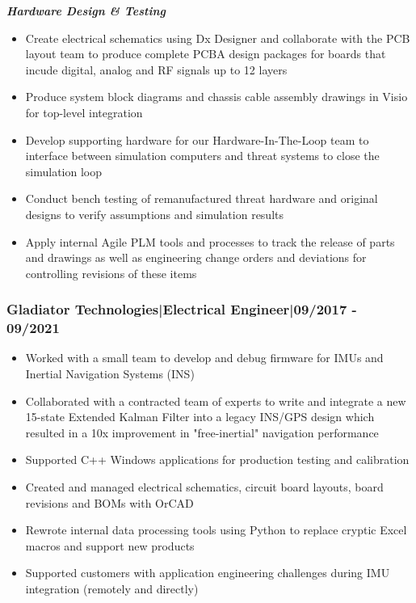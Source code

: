 \documentclass[]{article}
\begin{document}
\begin{singlespace}
\noindent\textbf{\emph{Hardware Design \& Testing}}    
\begin{itemize}
    \setlength\itemsep{0em}
    \item Create electrical schematics using Dx Designer and collaborate with the PCB layout team to produce 
    complete PCBA design packages for boards that incude digital, analog and RF signals up to 12 layers
    \item Produce system block diagrams and chassis cable assembly drawings in Visio for top-level integration
    \item Develop supporting hardware for our Hardware-In-The-Loop team to interface between simulation computers 
    and threat systems to close the simulation loop
    \item Conduct bench testing of remanufactured threat hardware and original designs to verify assumptions and simulation results
    \item Apply internal Agile PLM tools and processes to track the release of parts and drawings 
    as well as engineering change orders and deviations for controlling revisions of these items
\end{itemize}

\subsubsection*{Gladiator Technologies\hspace{3 mm}|\hspace{3 mm}Electrical Engineer\hspace{3 mm}|\hspace{3 mm}09/2017 - 09/2021}
\vspace{-2mm}
\begin{itemize}
    \setlength\itemsep{0em}
    \item Worked with a small team to develop and debug firmware for IMUs and Inertial Navigation Systems (INS)
    \item Collaborated with a contracted team of experts to write and integrate a new 15-state Extended Kalman Filter into a legacy INS/GPS design which resulted in a 10x improvement in "free-inertial" navigation performance
    \item Supported C++ Windows applications for production testing and calibration
    \item Created and managed electrical schematics, circuit board layouts, board revisions and BOMs with OrCAD
    \item Rewrote internal data processing tools using Python to replace cryptic Excel macros and support new products
    \item Supported customers with application engineering challenges during IMU integration (remotely and directly)
\end{itemize}



\end{singlespace}
\end{document}
